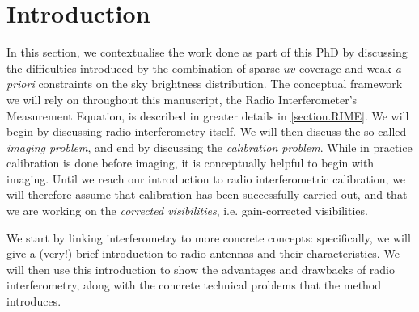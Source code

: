 \chapter{Introduction}
\minitoc

\pg
In this section, we contextualise the work done as part of this PhD by discussing the difficulties introduced by the combination of sparse $uv$-coverage and weak \emph{a priori} constraints on the sky brightness distribution. The conceptual framework we will rely on throughout this manuscript, the Radio Interferometer's Measurement Equation, is described in greater details in  \cref{section.RIME}. We will begin by discussing radio interferometry itself. We will then discuss the so-called \emph{imaging problem}, and end by discussing the \emph{calibration problem}. While in practice calibration is done before imaging, it is conceptually helpful to begin with imaging. Until we reach our introduction to radio interferometric calibration, we will therefore assume that calibration has been successfully carried out, and that we are working on the \emph{corrected visibilities}, i.e. gain-corrected visibilities. 

\pg
We start by linking interferometry to more concrete concepts: specifically, we will give a (very!) brief introduction to radio antennas and their characteristics. We will then use this introduction to show the advantages and drawbacks of radio interferometry, along with the concrete technical problems that the method introduces.


\clearpage

\clearpage

\clearpage

\clearpage
